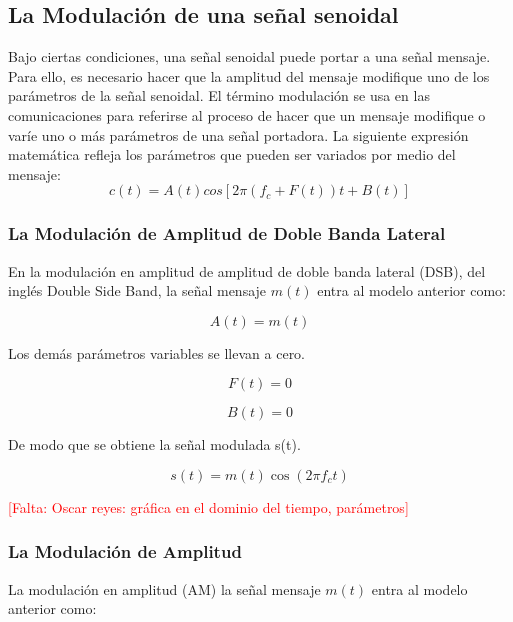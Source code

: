 \subsection{La Modulación de una señal senoidal}
Bajo ciertas condiciones, una señal senoidal puede portar a una señal mensaje. Para ello, es necesario hacer que la amplitud del mensaje modifique uno de los parámetros de la señal senoidal. %
El término modulación se usa en las comunicaciones para referirse al proceso de hacer que un mensaje modifique o varíe uno o más parámetros de una señal portadora. La siguiente expresión matemática refleja los parámetros que pueden ser variados por medio del mensaje:\\

\begin{equation} \label{equ_diez}
c(t)=A(t) cos[2 \pi (f_c+F(t))t+B(t)]
\end{equation} 
\subsubsection{La Modulación de Amplitud de Doble Banda Lateral}
En la modulación en amplitud de amplitud de doble banda lateral (DSB), del inglés Double Side Band, la señal mensaje $m(t)$ entra al modelo anterior como:

	\begin{equation} \label{equ_once}
		A(t)= m(t)
	\end{equation} 

Los demás parámetros variables se llevan a cero.

	\begin{equation} \label{equ_doce}
		F(t)= 0
    \end{equation}
    
    \begin{equation} \label{equ_trece}
		B(t)= 0
	\end{equation} 

De modo que se obtiene la señal modulada s(t).

	\begin{equation} \label{equ_catorce}
		s(t)=m(t)\cos(2 \pi f_ct)
	\end{equation} 

\textcolor{red}{[Falta: Oscar reyes: gráfica en el dominio del tiempo, parámetros]}

\subsubsection{La Modulación de Amplitud}
La modulación en amplitud (AM) la señal mensaje $m(t)$ entra al modelo anterior como:

